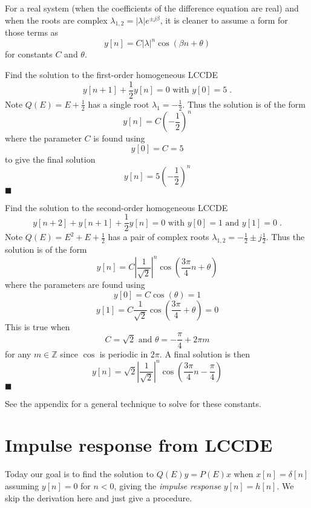 For a real system (when the coefficients of the difference equation are real) and when the roots are complex $\lambda_{1,2} = |\lambda|e^{\pm j\beta}$, it is cleaner to assume a form for those terms as
\[
y[n] = C |\lambda|^n\cos(\beta n + \theta)
\]
for constants $C$ and $\theta$.

\begin{example}
  Find the solution to the first-order homogeneous LCCDE
  \[
  y[n+1] + \frac{1}{2}y[n] = 0 \mbox{ with } y[0] = 5 \; .
  \]
  Note $Q(E) = E + \frac{1}{2}$ has a single root $\lambda_1 = -\frac{1}{2}$. Thus the solution is of the form
  \[
  y[n] = C\left( -\frac{1}{2}\right)^n
  \]
  where the parameter $C$ is found using
  \[
  y[0] = C = 5
  \]
  to give the final solution
  \[
  y[n] = 5\left( -\frac{1}{2}\right)^n
  \]
  $\blacksquare$  
\end{example}

\begin{example}
  Find the solution to the second-order homogeneous LCCDE
  \[
  y[n+2] + y[n+1] + \frac{1}{2}y[n] = 0 \mbox{ with } y[0] = 1 \mbox{ and } y[1] = 0\; .
  \]
  Note $Q(E) = E^2 + E + \frac{1}{2}$ has a pair of complex roots $\lambda_{1,2} = -\frac{1}{2} \pm j\frac{1}{2}$. Thus the solution is of the form
  \[
  y[n] = C \left|\frac{1}{\sqrt{2}}\right|^n\cos\left(\frac{3\pi}{4} n + \theta\right)
  \]
  where the parameters are found using
  \[
  y[0] = C\cos\left(\theta\right) = 1
  \]
  \[
  y[1] = C\frac{1}{\sqrt{2}}\cos\left(\frac{3\pi}{4} + \theta\right) = 0
  \]
  This is true when
  \[
  C = \sqrt{2} \mbox{ and } \theta = -\frac{\pi}{4} + 2\pi m
  \]
  for any $m\in \mathbb{Z}$ since $\cos$ is periodic in $2\pi$. A final solution is then
  \[
  y[n] = \sqrt{2} \left|\frac{1}{\sqrt{2}}\right|^n\cos\left(\frac{3\pi}{4} n - \frac{\pi}{4}\right)
  \]
  $\blacksquare$
\end{example}

See the appendix for a general technique to solve for these constants.

\section{Impulse response from LCCDE}

Today our goal is to find the solution to $Q(E)y=P(E)x$ when $x[n] = \delta[n]$ assuming $y[n] = 0$ for $n < 0$, giving the \emph{impulse response} $y[n] = h[n]$. We skip the derivation here and just give a procedure.

